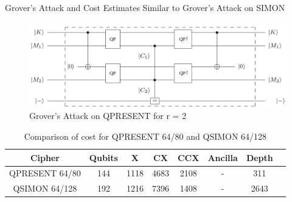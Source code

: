 \begin{frame}{Grover's Attack and Cost Estimates}
    Similar to Grover's Attack on SIMON
    \begin{figure}[h!]
    \centering
    \includegraphics[width=\linewidth]{present/qpgrov.jpg}
    \caption{Grover's Attack on QPRESENT for r = 2}
    \label{fig:qpgrov}
\end{figure}
\begin{center}
\pause
\begin{table}[h!]
    \centering
    \begin{tabular}{ |c|c|c|c|c|c|c|c| } 
     \hline
     Cipher  & Qubits & X & CX & CCX & Ancilla & Depth \\ \hline
     QPRESENT 64/80 & 144 & 1118 & 4683 & 2108 & - & 311 \\ \hline
     QSIMON 64/128 & 192 &1216 & 7396 & 1408 & - & 2643\\ \hline
    \end{tabular}
    \caption{Comparison of cost for QPRESENT 64/80 \cite{gop} and QSIMON 64/128\cite{gos} }
    \label{tab:cqpqs}
\end{table}
\end{center}
\end{frame}